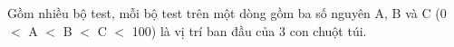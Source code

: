 Gồm nhiều bộ test, mỗi bộ test trên một dòng gồm ba số nguyên A, B và C (0 $<$ A $<$ B $<$ C $<$ 100) là vị trí ban đầu của 3 con chuột túi.

\